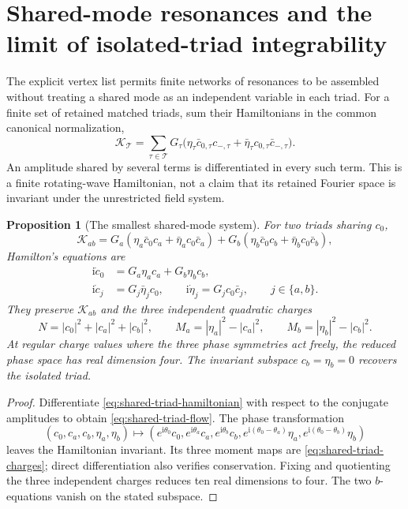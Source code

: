 \documentclass[11pt,a4paper,oneside]{book}
\theoremstyle{plain}
\newtheorem{proposition}[theorem]{Proposition}
\theoremstyle{definition}
\theoremstyle{remark}
\newcommand{\ii}{\mathrm i}
\newcommand{\src}[2]{\cite{#1}}
\begin{document}
\section{Shared-mode resonances and the limit of isolated-triad integrability}
\label{sec:shared-triads}
The explicit vertex list permits finite networks of resonances to be
assembled without treating a shared mode as an independent variable in
each triad.  For a finite set of retained matched triads, sum their
Hamiltonians in the common canonical normalization,
\begin{equation}
 \mathcal K_{\mathcal T}
 =\sum_{\tau\in\mathcal T}G_\tau
  \bigl(\eta_\tau\bar c_{0,\tau}c_{-,\tau}
       +\bar\eta_\tau c_{0,\tau}\bar c_{-,\tau}\bigr).
 \label{eq:many-triad-hamiltonian}
\end{equation}
An amplitude shared by several terms is differentiated in every such
term.  This is a finite rotating-wave Hamiltonian, not a claim that its
retained Fourier space is invariant under the unrestricted field system.
\src{R20}{thm:v20v33-hamiltonian}

\begin{proposition}[The smallest shared-mode system]
\label{prop:shared-triad-invariants}
For two triads sharing $c_0$,
\begin{equation}
 \mathcal K_{ab}=G_a(\eta_a\bar c_0c_a+\bar\eta_a c_0\bar c_a)
               +G_b(\eta_b\bar c_0c_b+\bar\eta_b c_0\bar c_b),
 \label{eq:shared-triad-hamiltonian}
\end{equation}
Hamilton's equations are
\begin{equation}
 \begin{aligned}
 \ii\dot c_0&=G_a\eta_ac_a+G_b\eta_bc_b,\\
 \ii\dot c_j&=G_j\bar\eta_jc_0,\qquad
 \ii\dot\eta_j=G_jc_0\bar c_j,\qquad j\in\{a,b\}.
 \end{aligned}
 \label{eq:shared-triad-flow}
\end{equation}
They preserve $\mathcal K_{ab}$ and the three independent quadratic
charges
\begin{equation}
 N=|c_0|^2+|c_a|^2+|c_b|^2,\qquad
 M_a=|\eta_a|^2-|c_a|^2,\qquad
 M_b=|\eta_b|^2-|c_b|^2.
 \label{eq:shared-triad-charges}
\end{equation}
At regular charge values where the three phase symmetries act freely,
the reduced phase space has real dimension four.  The invariant subspace
$c_b=\eta_b=0$ recovers the isolated triad.
\end{proposition}
\begin{proof}
Differentiate \eqref{eq:shared-triad-hamiltonian} with respect to the
conjugate amplitudes to obtain \eqref{eq:shared-triad-flow}.
The phase transformation
\[
 (c_0,c_a,c_b,\eta_a,\eta_b)\longmapsto
 (e^{\ii\theta_0}c_0,e^{\ii\theta_a}c_a,e^{\ii\theta_b}c_b,
 e^{\ii(\theta_0-\theta_a)}\eta_a,
 e^{\ii(\theta_0-\theta_b)}\eta_b)
\]
leaves the Hamiltonian invariant.  Its three moment maps are
\eqref{eq:shared-triad-charges}; direct differentiation also verifies
conservation.  Fixing and quotienting the three independent charges
reduces ten real dimensions to four.  The two $b$-equations vanish on the
stated subspace.
\end{proof}
\src{R20}{thm:v20v33-invariants,prop:v20v33-reduced}
\end{document}
